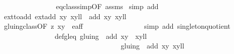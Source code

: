 \begin{isabellebody}
\ \ \ \ \ \ \ \ \ \ \ \ \ \ \isamarkupfalse%
\ eq{\isacharunderscore}class{\isacharunderscore}simp{\isacharbrackleft}OF\ assms{\isacharparenleft}{}{\isacharparenright}{\isacharbrackright}\ \isamarkupfalse%
{\isacharparenleft}simp\ add{\isacharcolon}\ {\isachardoublequoteopen}{}{\isachardoublequoteclose}{\isacharparenleft}{}{\isacharparenright}{\isacharparenright}\isanewline
\ \ \ \ \ \ \ \ \ \ \ \ \isamarkupfalse%
\ \isamarkupfalse%
\ ext{\isacharunderscore}to{\isacharunderscore}add{\isacharcolon}\ {\isachardoublequoteopen}{\isacharparenleft}ext{\isacharunderscore}add\ {\isacharparenleft}x{\isacharcomma}y{\isacharparenright}\ {\isacharparenleft}x{\isacharprime}{\isacharcomma}y{\isacharprime}{\isacharparenright}{\isacharcomma}l{\isacharplus}l{\isacharprime}{\isacharparenright}\ {\isacharequal}\ {\isacharparenleft}add\ {\isacharparenleft}x{\isacharcomma}y{\isacharparenright}\ {\isacharparenleft}x{\isacharprime}{\isacharcomma}y{\isacharprime}{\isacharparenright}{\isacharcomma}l{\isacharplus}l{\isacharprime}{\isacharparenright}{\isachardoublequoteclose}\ \isanewline
\ \ \ \ \ \ \ \ \ \ \ \ \ \ \isamarkupfalse%
\ gluing{\isacharunderscore}class{\isacharbrackleft}OF\ z{}\ {\isacartoucheopen}{\isacharparenleft}x{\isacharcomma}y{\isacharparenright}\ {\isasymin}\ e{\isacharunderscore}aff{\isacartoucheclose}{\isacharbrackright}\ \isanewline
\ \ \ \ \ \ \ \ \ \ \ \ \ \ \isamarkupfalse%
\ {\isacharparenleft}simp\ add{\isacharcolon}\ singleton{\isacharunderscore}quotient{\isacharparenright}\ \ \isanewline
\ \ \ \ \ \ \ \ \ \ \ \ \isamarkupfalse%
\ \isamarkupfalse%
\ def{\isacharunderscore}gl{\isacharunderscore}eq{\isacharcolon}\ {\isachardoublequoteopen}gluing\ {\isacharbackquote}{\isacharbackquote}\ {\isacharbraceleft}{\isacharparenleft}{\isacharparenleft}add\ {\isacharparenleft}x{\isacharcomma}y{\isacharparenright}\ {\isacharparenleft}{\isasymtau}\ {\isacharparenleft}x{\isacharprime}{\isacharcomma}y{\isacharprime}{\isacharparenright}{\isacharparenright}{\isacharparenright}{\isacharcomma}l{\isacharplus}l{\isacharprime}{\isacharplus}{}{\isacharparenright}{\isacharbraceright}\ {\isacharequal}\ \isanewline
\ \ \ \ \ \ \ \ \ \ \ \ \ \ \ \ \ \ \ \ \ \ \ \ \ \ \ \ \ \ \ \ \ \ gluing\ {\isacharbackquote}{\isacharbackquote}\ {\isacharbraceleft}{\isacharparenleft}add\ {\isacharparenleft}x{\isacharcomma}y{\isacharparenright}\ {\isacharparenleft}x{\isacharprime}{\isacharcomma}y{\isacharprime}{\isacharparenright}{\isacharcomma}l{\isacharplus}l{\isacharprime}{\isacharparenright}{\isacharbraceright}{\isachardoublequoteclose}\isanewline

\end{isabellebody}
